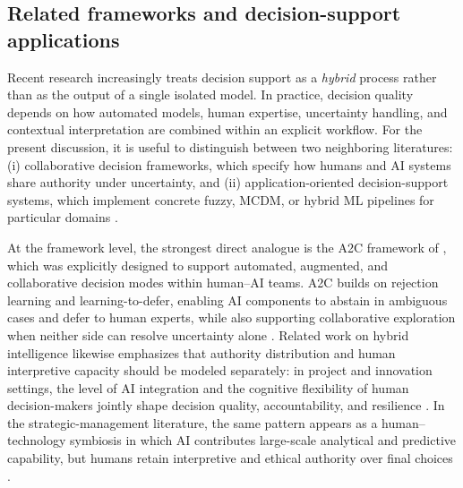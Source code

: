 \subsection{Related frameworks and decision-support applications}\label{sec:related}

Recent research increasingly treats decision support as a \emph{hybrid} process rather than as the output of a single isolated model. In practice, decision quality depends on how automated models, human expertise, uncertainty handling, and contextual interpretation are combined within an explicit workflow. For the present discussion, it is useful to distinguish between two neighboring literatures: (i) collaborative decision frameworks, which specify how humans and AI systems share authority under uncertainty, and (ii) application-oriented decision-support systems, which implement concrete fuzzy, MCDM, or hybrid ML pipelines for particular domains \citep{Tariq2024A2C,Deliu2026HAIC,Abdulgader2018Fuzzy,Sahraei2022Flood}.

At the framework level, the strongest direct analogue is the A2C framework of \citet{Tariq2024A2C}, which was explicitly designed to support automated, augmented, and collaborative decision modes within human--AI teams. A2C builds on rejection learning and learning-to-defer, enabling AI components to abstain in ambiguous cases and defer to human experts, while also supporting collaborative exploration when neither side can resolve uncertainty alone \citep{Tariq2024A2C}. Related work on hybrid intelligence likewise emphasizes that authority distribution and human interpretive capacity should be modeled separately: in project and innovation settings, the level of AI integration and the cognitive flexibility of human decision-makers jointly shape decision quality, accountability, and resilience \citep{Deliu2026HAIC}. In the strategic-management literature, the same pattern appears as a human--technology symbiosis in which AI contributes large-scale analytical and predictive capability, but humans retain interpretive and ethical authority over final choices \citep{Telaumbanua2025Symbiosis}.


